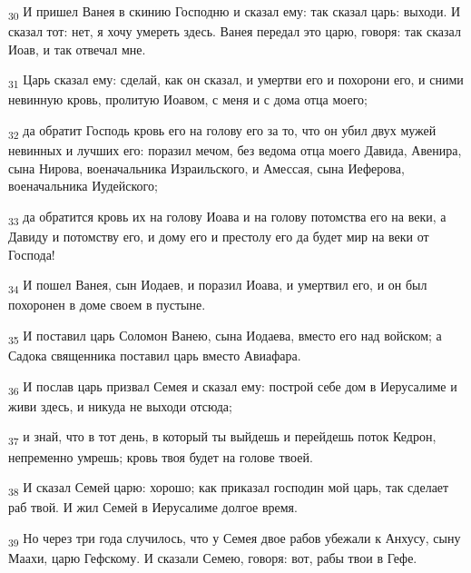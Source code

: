 \begin{tcolorbox}
\textsubscript{30} И пришел Ванея в скинию Господню и сказал ему: так сказал царь: выходи. И сказал тот: нет, я хочу умереть здесь. Ванея передал это царю, говоря: так сказал Иоав, и так отвечал мне.
\end{tcolorbox}
\begin{tcolorbox}
\textsubscript{31} Царь сказал ему: сделай, как он сказал, и умертви его и похорони его, и сними невинную кровь, пролитую Иоавом, с меня и с дома отца моего;
\end{tcolorbox}
\begin{tcolorbox}
\textsubscript{32} да обратит Господь кровь его на голову его за то, что он убил двух мужей невинных и лучших его: поразил мечом, без ведома отца моего Давида, Авенира, сына Нирова, военачальника Израильского, и Амессая, сына Иеферова, военачальника Иудейского;
\end{tcolorbox}
\begin{tcolorbox}
\textsubscript{33} да обратится кровь их на голову Иоава и на голову потомства его на веки, а Давиду и потомству его, и дому его и престолу его да будет мир на веки от Господа!
\end{tcolorbox}
\begin{tcolorbox}
\textsubscript{34} И пошел Ванея, сын Иодаев, и поразил Иоава, и умертвил его, и он был похоронен в доме своем в пустыне.
\end{tcolorbox}
\begin{tcolorbox}
\textsubscript{35} И поставил царь Соломон Ванею, сына Иодаева, вместо его над войском; а Садока священника поставил царь вместо Авиафара.
\end{tcolorbox}
\begin{tcolorbox}
\textsubscript{36} И послав царь призвал Семея и сказал ему: построй себе дом в Иерусалиме и живи здесь, и никуда не выходи отсюда;
\end{tcolorbox}
\begin{tcolorbox}
\textsubscript{37} и знай, что в тот день, в который ты выйдешь и перейдешь поток Кедрон, непременно умрешь; кровь твоя будет на голове твоей.
\end{tcolorbox}
\begin{tcolorbox}
\textsubscript{38} И сказал Семей царю: хорошо; как приказал господин мой царь, так сделает раб твой. И жил Семей в Иерусалиме долгое время.
\end{tcolorbox}
\begin{tcolorbox}
\textsubscript{39} Но через три года случилось, что у Семея двое рабов убежали к Анхусу, сыну Маахи, царю Гефскому. И сказали Семею, говоря: вот, рабы твои в Гефе.
\end{tcolorbox}
